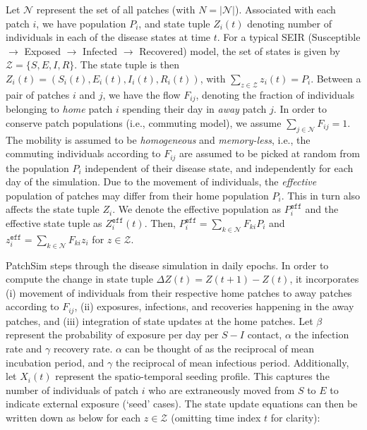 \documentclass[10pt]{scrartcl}
\theoremstyle{definition}
\begin{document}
Let $\mathcal{N}$ represent the set of all patches (with $N = |\mathcal{N}|$). 
Associated with each patch $i$, we have population $P_i$, and state tuple 
$Z_i(t)$ denoting number of individuals in each of the disease states at time 
$t$. For a typical SEIR (Susceptible $\to$ Exposed $\to$ Infected $\to$ 
Recovered) model, the set of states is given by $\mathcal{Z} = \{S,E,I,R\}$. 
The state tuple is then $Z_i(t) = (S_i(t), E_i(t), I_i(t), R_i(t))$, with 
$\sum_{z\in\mathcal{Z}} z_i(t) = P_i$. Between a pair of patches $i$ and $j$, 
we have the flow $F_{ij}$, denoting the fraction of individuals belonging to 
\emph{home} patch $i$ spending their day in \emph{away} patch $j$. In order to 
conserve patch populations (i.e., commuting model), we assume $\sum_{j \in 
\mathcal{N}}F_{ij} = 1$. The mobility is assumed to be \emph{homogeneous} and 
\emph{memory-less}, i.e., the commuting individuals according to $F_{ij}$ are 
assumed to be picked at random from the population $P_i$ independent of their 
disease state, and independently for each day of the simulation. Due to the 
movement of individuals, the \emph{effective} population of patches may differ 
from their home population $P_i$. This in turn also affects the state tuple 
$Z_i$. We denote the effective population as $P_i^{\mathtt{eff}}$ and the 
effective state tuple as $Z_i^{\mathtt{eff}}(t)$. Then, $P^{\mathtt{eff}}_i = 
\sum_{k\in \mathcal{N}} F_{ki} P_i$ and  $z^{\mathtt{eff}}_i = \sum_{k\in 
\mathcal{N}} F_{ki} z_i$ for $z\in \mathcal{Z}$. 

PatchSim steps through the disease simulation in daily epochs. In order to 
compute the change in state tuple $\Delta Z(t) = Z(t+1) - Z(t)$, it 
incorporates (i) movement of individuals from their respective home patches to 
away patches according to $F_{ij}$, (ii) exposures, infections, and recoveries 
happening in the away patches, and (iii) integration of state updates at the 
home patches. Let $\beta$ represent the probability of exposure per day per 
$S-I$ contact, $\alpha$ the infection rate and $\gamma$ recovery rate. $\alpha$ 
can be thought of as the reciprocal of mean incubation period, and $\gamma$ the 
reciprocal of mean infectious period. Additionally, let $X_i(t)$ represent the 
spatio-temporal seeding profile. This captures the number of individuals of 
patch $i$ who are extraneously moved from $S$ to $E$ to indicate external 
exposure (`seed' cases). The state update equations can then be written down as 
below for each $z\in\mathcal{Z}$ (omitting time index $t$ for clarity):
\end{document}
